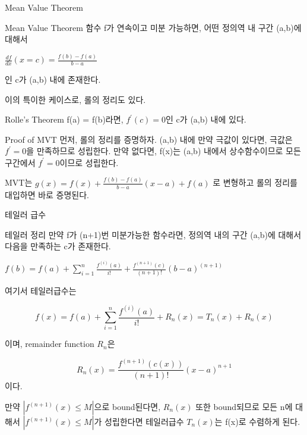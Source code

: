 \documentclass{beamer}
\begin{document}
\begin{frame}{Mean Value Theorem}
\begin{block}{Mean Value Theorem} 
함수 f가 연속이고 미분 가능하면, 어떤 정의역 내 구간 (a,b)에 대해서 

$\frac{df}{dx}(x=c) = \frac{f(b)-f(a)}{b-a}$

인 c가 (a,b) 내에 존재한다. 
\end{block}

이의 특이한 케이스로, 롤의 정리도 있다. 

\begin{block}{Rolle's Theorem}
f(a) = f(b)라면, $f^{\prime}(c)=0$인 c가 (a,b) 내에 있다. 
\end{block}
\end{frame}
\begin{frame}{Proof of MVT} 
먼저, 롤의 정리를 증명하자. (a,b) 내에 만약 극값이 있다면, 극값은 $f^{\prime} = 0$을 만족하므로 성립한다. 만약 없다면, f(x)는 (a,b) 내에서 상수함수이므로 모든 구간에서 $f^{\prime} = 0$이므로 성립한다. 

MVT는 $g(x) = f(x) + \frac{f(b)-f(a)}{b-a}(x-a)+f(a)$ 로 변형하고 롤의 정리를 대입하면 바로 증명된다. 
\end{frame}

\begin{frame}[allowframebreaks]{테일러 급수} 
\begin{block}{테일러 정리} 
만약 f가 (n+1)번 미분가능한 함수라면, 정의역 내의 구간 (a,b)에 대해서 다음을 만족하는 c가 존재한다. 

$f(b) = f(a) +  \sum_{i=1}^n \frac{f^{(i)}(a)}{i!} +\frac{ f^{(n+1)}(c)}{(n+1)!} (b-a)^{(n+1)}$
\end{block}

여기서 테일러급수는 

\begin{equation} 
f(x) = f(a) + \sum_{i=1}^n \frac{f^{(i)}(a)}{i!} + R_n(x) = T_n(x) + R_n(x)
\end{equation}

이며, remainder function $R_n$은 

\begin{equation} 
R_n(x) = \frac{f^{(n+1)}(c(x))}{(n+1)!}(x-a)^{n+1}
\end{equation}
이다. 

만약 $|f^{(n+1)}(x) \leq M|$으로 bound된다면, $R_n(x)$ 또한 bound되므로 모든 n에 대해서 $|f^{(n+1)}(x) \leq M|$가 성립한다면 테일러급수 $T_n(x)$는 f(x)로 수렴하게 된다. 
\end{frame}
\end{document}
